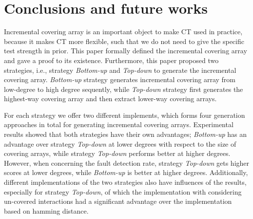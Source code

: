 \documentclass[conference]{IEEEtran}
\theoremstyle{definition}
\begin{document}
\section{Conclusions and future works}
Incremental covering array is an important object to make CT used in practice, because it makes CT more flexible, such that we do not need to give the specific test strength in prior. This paper formally defined the incremental covering array and gave a proof to its existence. Furthermore, this paper proposed two strategies, i.e., strategy \emph{Bottom-up} and \emph{Top-down} to generate the incremental covering array. \emph{Bottom-up} strategy generates incremental covering array from low-degree to high degree sequently, while \emph{Top-down} strategy first generates the highest-way covering array and then extract lower-way covering arrays.

For each strategy we offer two different implements, which forms four generation approaches in total for generating incremental covering arrays. Experimental results showed that both strategies have their own advantages; \emph{Bottom-up} has an advantage over strategy \emph{Top-down} at lower degrees with respect to the size of covering arrays, while strategy \emph{Top-down} performs better at higher degrees. However, when concerning the fault detection rate, strategy \emph{Top-down} gets higher scores at lower degrees, while \emph{Bottom-up} is better at higher degrees. Additionally, different implementations of the two strategies also have influences of the results, especially for strategy \emph{Top-down}, of which the implementation with considering un-covered interactions had a significant advantage over the implementation based on hamming distance.

\end{document}
